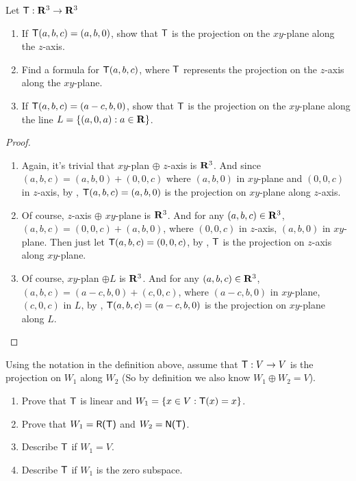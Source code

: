 \begin{exercise} \label{exercise 2.1.26}
Let \(\textsf{T}: \mathbf{R}^3 \to \mathbf{R}^3\)
\begin{enumerate}
\item If \(\textsf{T}(a, b, c) = (a, b, 0)\), show that \(\textsf{T}\) is the projection on the \(xy\)-plane along the \(z\)-axis.
\item Find a formula for \(\textsf{T}(a, b, c)\), where \(\textsf{T}\) represents the projection on the \(z\)-axis along the \(xy\)-plane.
\item If \(\textsf{T}(a, b, c) = (a - c, b, 0)\), show that \(\textsf{T}\) is the projection on the \(xy\)-plane along the line \(L = \{ (a, 0, a) : a \in \mathbf{R} \}\).
\end{enumerate}
\end{exercise}

\begin{proof} \ 
\begin{enumerate}
\item Again, it's trivial that \(xy\)-plan \(\oplus\) \(z\)-axis is \(\mathbf{R}^3\).
And since \((a, b, c) = (a, b, 0) + (0, 0, c)\) where \((a, b, 0)\) in \(xy\)-plane and \((0, 0, c)\) in \(z\)-axis, by , \(\textsf{T}(a, b, c) = (a, b, 0)\) is the projection on \(xy\)-plane along \(z\)-axis.

\item Of course, \(z\)-axis \(\oplus\) \(xy\)-plane is \(\mathbf{R}^3\).
And for any \((a, b, c) \in \mathbf{R}^3\), \((a, b, c) = (0, 0, c) + (a, b, 0)\), where \((0, 0, c)\) in \(z\)-axis, \((a, b, 0)\) in \(xy\)-plane.
Then just let \(\textsf{T}(a, b, c) = (0, 0, c)\), by \ADEF{2.2}, \(\textsf{T}\) is the projection on \(z\)-axis along \(xy\)-plane.

\item Of course, \(xy\)-plan \(\oplus L\) is \(\mathbf{R}^3\).
And for any \((a, b, c) \in \mathbf{R}^3\), \((a, b, c) = (a - c, b, 0) + (c, 0, c)\), where \((a - c, b, 0)\) in \(xy\)-plane, \((c, 0, c)\) in \(L\),
by \ADEF{2.2}, \(\textsf{T}(a, b, c) = (a - c, b, 0)\) is the projection on \(xy\)-plane along \(L\).
\end{enumerate}
\end{proof}

\begin{exercise} \label{exercise 2.1.27}
Using the notation in the definition above, assume that \(\textsf{T} : V \to V\) is the projection on \(W_1\) along \(W_2\)
(So by definition we also know \(W_1 \oplus W_2 = V\)).
\begin{enumerate}
\item Prove that \(\textsf{T}\) is linear and \(W_1 = \{ x \in V: \textsf{T}(x) = x \}\).
\item Prove that \(W_1 = \textsf{R(T)}\) and \(W_2 = \textsf{N(T)}\).
\item Describe \(\textsf{T}\) if \(W_1 = V\).
\item Describe \(\textsf{T}\) if \(W_1\) is the zero subspace.
\end{enumerate}
\end{exercise}

